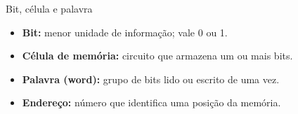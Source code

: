 \begin{frame}[t]{Bit, célula e palavra}
  \begin{itemize}
    \item \textbf{Bit:} menor unidade de informação; vale 0 ou 1.
    \item \textbf{Célula de memória:} circuito que armazena um ou mais bits.
    \item \textbf{Palavra (word):} grupo de bits lido ou escrito de uma vez.
    \item \textbf{Endereço:} número que identifica uma posição da memória.
  \end{itemize}
  \begin{center}
  \begin{memdiagram}
  \end{memdiagram}
  \end{center}
\end{frame}
